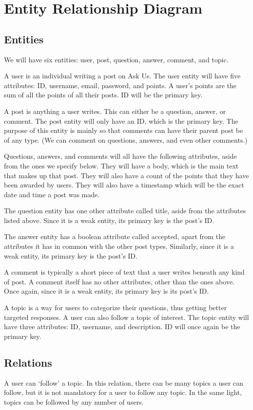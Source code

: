 \section{Entity Relationship Diagram}
\subsection{Entities}
We will have six entities: user, post, question, answer, comment, and topic.

A user is an individual writing a post on Ask Us. The user entity will have five attributes: ID, username, email, password, and points. A user's points are the sum of all the points of all their posts. ID will be the primary key.

A post is anything a user writes. This can either be a question, answer, or comment. The post entity will only have an ID, which is the primary key. The purpose of this entity is mainly so that comments can have their parent post be of any type. (We can comment on questions, answers, and even other comments.)

Questions, answers, and comments will all have the following attributes, aside from the ones we specify below. They will have a body, which is the main text that makes up that post. They will also have a count of the points that they have been awarded by users. They will also have a timestamp which will be the exact date and time a post was made.

The question entity has one other attribute called title, aside from the attributes listed above. Since it is a weak entity, its primary key is the post's ID.

The answer entity has a boolean attribute called accepted, apart from the attributes it has in common with the other post types. Similarly, since it is a weak entity, its primary key is the post's ID.

A comment is typically a short piece of text that a user writes beneath any kind of post. A comment itself has no other attributes, other than the ones above. Once again, since it is a weak entity, its primary key is its post's ID.

A topic is a way for users to categorize their questions, thus getting better targeted responses. A user can also follow a topic of interest. The topic entity will have three attributes: ID, username, and description. ID will once again be the primary key.

\subsection{Relations}
A user can `follow' a topic. In this relation, there can be many topics a user can follow, but it is not mandatory for a user to follow any topic. In the same light, topics can be followed by any number of users.

